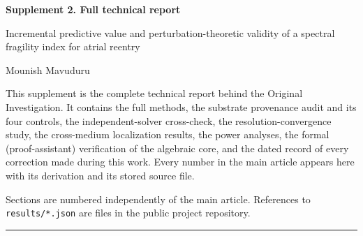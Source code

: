 \documentclass[11pt]{article}
\theoremstyle{definition}
\newcommand{\code}[1]{\texttt{#1}}
\begin{document}
\thispagestyle{empty}

\begin{center}
{\Large\bfseries Supplement 2. Full technical report\par}
\vspace{6pt}
{\large Incremental predictive value and perturbation-theoretic validity of a
spectral fragility index for atrial reentry\par}
\vspace{4pt}
Mounish Mavuduru
\end{center}

\vspace{1em}
\noindent This supplement is the complete technical report behind the Original
Investigation. It contains the full methods, the substrate provenance audit and
its four controls, the independent-solver cross-check, the resolution-convergence
study, the cross-medium localization results, the power analyses, the formal
(proof-assistant) verification of the algebraic core, and the dated record of
every correction made during this work. Every number in the main article appears
here with its derivation and its stored source file.

\noindent Sections are numbered independently of the main article. References to
\code{results/*.json} are files in the public project repository.

\vspace{1em}
\hrule
\vspace{1em}
\end{document}
